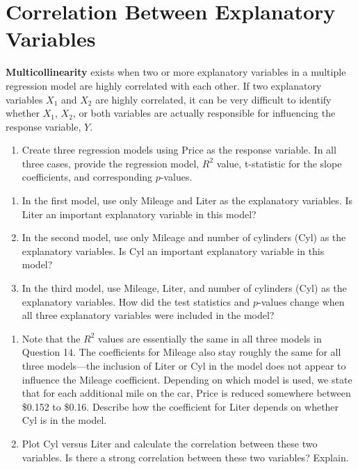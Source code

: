 \documentclass[
]{report}
\providecommand{\tightlist}{%
  \setlength{\itemsep}{0pt}\setlength{\parskip}{0pt}}
\begin{document}
\section*{Correlation Between Explanatory Variables}\label{correlation-between-explanatory-variables}

\textbf{Multicollinearity} exists when two or more explanatory variables in a multiple regression model are highly correlated with each other. If two explanatory variables \(X_1\) and \(X_2\) are highly correlated, it can be very difficult to identify whether \(X_1\), \(X_2\), or both variables are actually responsible for influencing the response variable, \(Y\).

\begin{enumerate}
\def\labelenumi{\arabic{enumi}.}
\setcounter{enumi}{13}
\tightlist
\item
  Create three regression models using Price as the response variable. In all three cases, provide the regression model, \(R^2\) value, t-statistic for the slope coefficients, and corresponding \(p\)-values.
\end{enumerate}

\begin{enumerate}
\def\labelenumi{\alph{enumi}.}
\tightlist
\item
  In the first model, use only Mileage and Liter as the explanatory variables. Is Liter an important explanatory variable in this model?
\item
  In the second model, use only Mileage and number of cylinders (Cyl) as the explanatory variables. Is Cyl an important explanatory variable in this model?
\item
  In the third model, use Mileage, Liter, and number of cylinders (Cyl) as the explanatory variables. How did the test statistics and \(p\)-values change when all three explanatory variables were included in the model?
\end{enumerate}

\begin{enumerate}
\def\labelenumi{\arabic{enumi}.}
\setcounter{enumi}{14}
\item
  Note that the \(R^2\) values are essentially the same in all three models in Question 14. The coefficients for Mileage also stay roughly the same for all three models---the inclusion of Liter or Cyl in the model does not appear to influence the Mileage coefficient. Depending on which model is used, we state that for each additional mile on the car, Price is reduced somewhere between \$0.152 to \$0.16. Describe how the coefficient for Liter depends on whether Cyl is in the model.
\item
  Plot Cyl versus Liter and calculate the correlation between these two variables. Is there a strong correlation between these two variables? Explain.
\end{enumerate}
\end{document}

